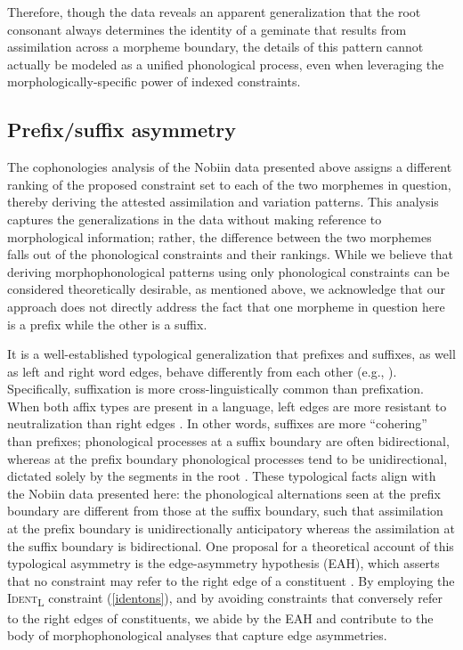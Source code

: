 \documentclass[output=paper]{langscibook}
\begin{document}
\z


Therefore, though the data reveals an apparent generalization that the root consonant always determines the identity of a geminate that results from assimilation across a morpheme boundary, the details of this pattern cannot actually be modeled as a unified phonological process, even when leveraging the morphologically-specific power of indexed constraints. 

\subsection{Prefix/suffix asymmetry}\label{edgeasymmetries}
The cophonologies analysis of the Nobiin data presented above assigns a different ranking of the proposed constraint set to each of the two morphemes in question, thereby deriving the attested assimilation and variation patterns. This analysis captures the generalizations in the data without making reference to morphological information; rather, the difference between the two morphemes falls out of the phonological constraints and their rankings. While we believe that deriving morphophonological patterns using only phonological constraints can be considered theoretically desirable, as mentioned above, we acknowledge that our approach does not directly address the fact that one morpheme in question here is a prefix while the other is a suffix. 

It is a well-established typological generalization that prefixes and suffixes, as well as left and right word edges, behave differently from each other (e.g., \citealp{byedelacy, hyman2008, pycha}). Specifically, suffixation is more cross-linguistically common than prefixation. When both affix types are present in a language, left edges are more resistant to neutralization than right edges \citep{byedelacy}. In other words, suffixes are more ``cohering'' than prefixes; phonological processes at a suffix boundary are often bidirectional, whereas at the prefix boundary phonological processes tend to be unidirectional, dictated solely by the segments in the root \citep{hyman2008}. These typological facts align with the Nobiin data presented here: the phonological alternations seen at the prefix boundary are different from those at the suffix boundary, such that assimilation at the prefix boundary is unidirectionally anticipatory whereas the assimilation at the suffix boundary is bidirectional. One proposal for a theoretical account of this typological asymmetry is the edge-asymmetry hypothesis (EAH), which asserts that no constraint may refer to the right edge of a constituent \citep{byedelacy}. By employing the \textsc{Ident\textsubscript{L}} constraint (\ref{identons}), and by avoiding constraints that conversely refer to the right edges of constituents, we abide by the EAH and contribute to the body of morphophonological analyses that capture edge asymmetries.
\end{document}
